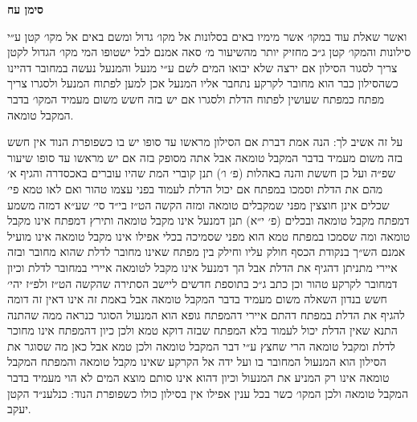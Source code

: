 \documentclass[12pt, openany]{book}
\newcommand{\chapname}{}
\newcommand{\newchap}[1]{
	\addcontentsline{toc}{chapter}{#1}
	\renewcommand{\chapname}{#1}
		\begin{center}
			\textbf{%
\fontsize{16pt}{16pt}\selectfont
				#1}
		\end{center}
}
\begin{document}
\newchap{סימן עח}
\begin{multicols}{2}
ואשר שאלת עוד במקו׳ אשר מימיו באים בסלונות אל מקו׳ גדול ומשם באים אל מקו׳ קטן ע״י סילונות והמקו׳ קטן ג״כ מחזיק יותר מהשיעור מ׳ סאה אמנם לבל ישטופו המי מקו׳ הגדול לקטן צריך לסגור הסילון אם ירצה שלא יבואו המים לשם ע״י מנעל והמנעל נעשה במחובר דהיינו כשהסילון כבר הוא מחובר לקרקע נתחבר אליו המנעל אכן למען לפתוח המנעל ולסגרו צריך מפתח כמפתח שעושין לפתוח הדלת ולסגרו אם יש בזה חשש משום מעמיד המקו׳ בדבר המקבל טומאה.\\\vspace{0pt}

על זה אשיב לך: הנה אמת דברת אם הסילון מראשו עד סופו יש בו כשפופרת הנוד אין חשש בזה משום מעמיד בדבר המקבל טומאה אבל אתה מסופק בזה אם יש מראשו עד סופו שיעור שפ״ה ועל כן חששת והנה באהלות (פ׳ ו׳) תנן קוברי המת שהיו עוברים באכסדרה והגיף א׳ מהם את הדלת וסמכו במפתח אם יכול הדלת לעמוד בפני עצמו טהור ואם לאו טמא פי׳ שכלים אינן חוצצין מפני שמקבלים טומאה ומזה הקשה הט״ז בי״ד סי׳ שע״א דמזה משמע דמפתח מקבל טומאה ובכלים (פ׳ י״א) תנן דמנעל אינו מקבל טומאה ותירץ דמפתח אינו מקבל טומאה ומה שסמכו במפתח טמא הוא מפני שסמיכה בכלי אפילו אינו מקבל טומאה אינו מועיל אמנם הש״ך בנקודת הכסף חולק עליו וחילק בין מפתח שאינו מחובר לדלת שהוא מחובר ובזה איירי מתניתן דהגיף את הדלת אבל הך דמנעל אינו מקבל לטומאה איירי במחובר לדלת וכיון דמחובר לקרקע טהור וכן כתב ג״כ בתוספת חדשים ליישב הסתירה שהקשה הט״ז ולפ״ז יהי׳ חשש בנדון השאלה משום מעמיד בדבר המקבל טומאה אבל באמת זה אינו דאין זה דומה להגיף את הדלת במפתח דהתם איירי דהמפתח גופא הוא המנעול הסוגר כנראה ממה שהתנה התנא שאין הדלת יכול לעמוד בלא המפתח שבזה דוקא טמא ולכן כיון דהמפתח אינו מחוכר לדלת ומקבל טומאה הרי שחצץ ע״י דבר המקבל טומאה ולכן טמא אבל כאן מה שסוגר את הסילון הוא המנעול המחובר בו ועל ידה אל הקרקע שאינו מקבל טומאה והמפתח המקבל טומאה אינו רק המניע את המנעול וכיון דהוא אינו סותם מוצא המים לא הוי מעמיד בדבר המקבל טומאה ולכן המקו׳ כשר בכל ענין אפילו אין בסילון כולו כשפופרת הנוד: כנלענ״ד הקטן יעקב.\\\vspace{0pt}

\end{multicols}\newpage
\end{document}
